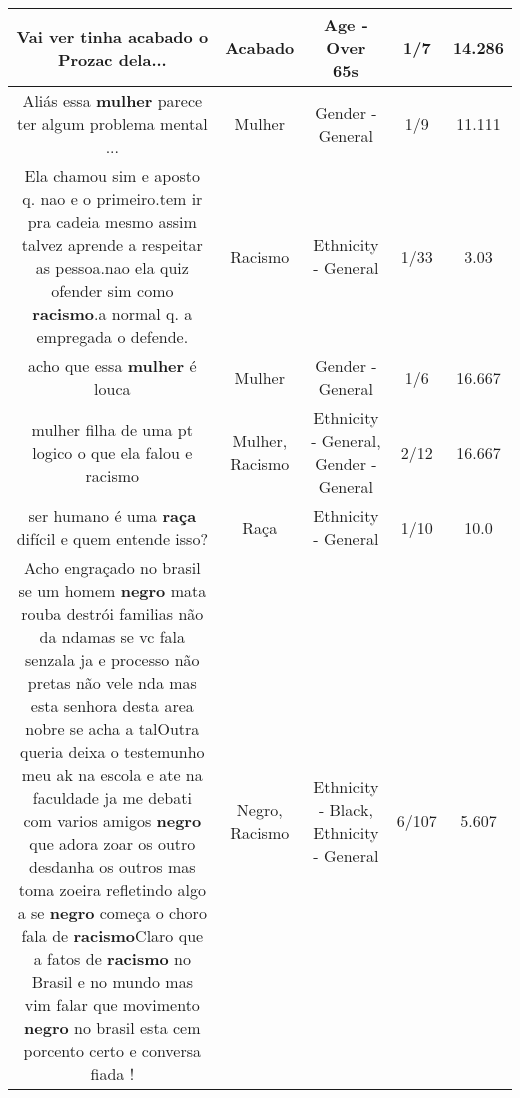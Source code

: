 \documentclass[11pt]{article}
\newlength\mylength
\begin{document}
\begin{center}
\begin{longtable}{|C{.65\mylength}|C{.30\mylength}|C{.12\mylength}|C{.12\mylength}|C{.12\mylength}|}
  \small Vai ver tinha \textbf{acabado} o Prozac dela...\normalsize   & Acabado & Age - Over 65s & 1/7 & 14.286 \\  \hline
  \small Aliás essa \textbf{mulher} parece ter algum problema mental ...\normalsize   & Mulher & Gender - General & 1/9 & 11.111 \\  \hline
  \small Ela chamou sim e aposto q. nao e o primeiro.tem ir pra cadeia mesmo assim talvez aprende a respeitar as pessoa.nao ela quiz ofender sim como \textbf{racismo}.a normal q. a empregada o defende.\normalsize   & Racismo & Ethnicity - General & 1/33 & 3.03 \\  \hline
  \small acho que essa \textbf{mulher} é louca\normalsize   & Mulher & Gender - General & 1/6 & 16.667 \\  \hline
  \small mulher filha de uma pt logico o que ela falou e racismo\normalsize   & Mulher, Racismo & Ethnicity - General, Gender - General & 2/12 & 16.667 \\  \hline
  \small ser humano é uma \textbf{raça} difícil   e quem  entende isso?\normalsize   & Raça & Ethnicity - General & 1/10 & 10.0 \\  \hline
  \small Acho engraçado no brasil se um homem \textbf{negro} mata rouba destrói familias não da ndamas se vc fala senzala ja e processo não pretas não vele nda  mas esta senhora  desta area nobre se acha a talOutra queria deixa o testemunho meu ak na escola e ate na faculdade ja me debati com  varios amigos \textbf{negro} que adora zoar os outro desdanha os outros mas toma zoeira refletindo algo a se \textbf{negro} começa o choro fala de \textbf{racismo}Claro que a fatos de \textbf{racismo} no Brasil e no mundo mas vim falar que movimento \textbf{negro} no brasil esta cem porcento certo e conversa fiada !\normalsize   & Negro, Racismo & Ethnicity - Black, Ethnicity - General & 6/107 & 5.607 \\  \hline

\end{longtable}
\end{center}
\end{document}
